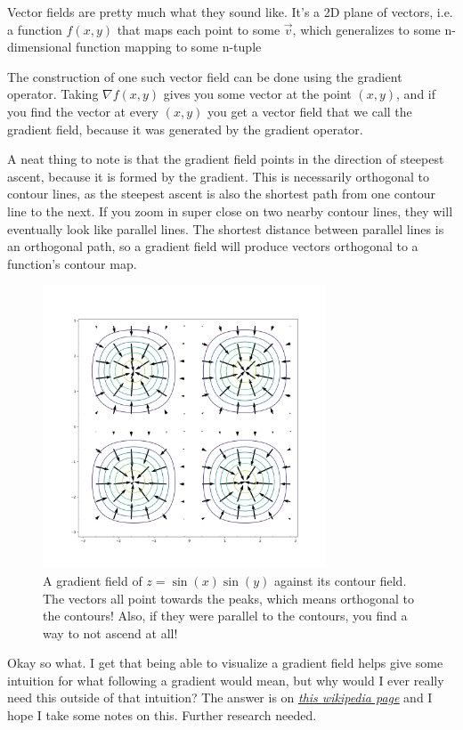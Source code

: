 \documentclass[12pt, letterpaper]{article}
\newcommand{\externalLink}[2]{\emph{\underline{\href{#1}{#2}}}}
\begin{document}
Vector fields are pretty much what they sound like. It's a 2D plane of vectors, i.e. a function $f(x, y)$ that maps each point to some $\vec{v}$, which generalizes to some n-dimensional function mapping to some n-tuple

The construction of one such vector field can be done using the gradient operator. Taking $\nabla f(x, y)$ gives you some vector at the point $(x, y)$, and if you find the vector at every $(x, y)$ you get a vector field that we call the gradient field, because it was generated by the gradient operator. 

A neat thing to note is that the gradient field points in the direction of steepest ascent, because it is formed by the gradient. This is necessarily orthogonal to contour lines, as the steepest ascent is also the shortest path from one contour line to the next. If you zoom in super close on two nearby contour lines, they will eventually look like parallel lines. The shortest distance between parallel lines is an orthogonal path, so a gradient field will produce vectors orthogonal to a function's contour map.

\begin{figure}[h]
    \centering 
    \includegraphics[width=0.75\textwidth]{orthogonalContour}
    \caption{A gradient field of $z = \sin(x)\sin(y)$ against its contour field. The vectors all point towards the peaks, which means orthogonal to the contours! Also, if they were parallel to the contours, you find a way to not ascend at all!}
\end{figure}

Okay so what. I get that being able to visualize a gradient field helps give some intuition for what following a gradient would mean, but why would I ever really need this outside of that intuition? 
The answer is on \externalLink{https://en.wikipedia.org/wiki/Vector_field\#Operations_on_vector_fields}{this wikipedia page} and I hope I take some notes on this. 
Further research needed.
\end{document}
